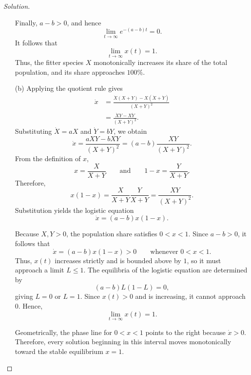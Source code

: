 \documentclass[10pt]{amsart}
\newenvironment{solution}
{\begin{proof}[Solution]}
{\end{proof}}
\begin{document}
\begin{onehalfspace}
\begin{solution}
\begin{itemize}
                Finally, \(a-b>0\), and hence
                \[
                    \lim_{t\to\infty}e^{-(a-b)t}=0.
                \]
                It follows that
                \[
                    \boxed{\lim_{t\to\infty}x(t)=1.}
                \]
                Thus, the fitter species \(X\) monotonically increases its share of
                the total population, and its share approaches \(100\%\).

                \item[(b)] Applying the quotient rule gives
                \begin{align*}
                    \dot{x}
                    &=\frac{\dot{X}(X+Y)-X(\dot{X}+\dot{Y})}
                    {(X+Y)^2}\\
                    &=\frac{\dot{X}Y-X\dot{Y}}{(X+Y)^2}.
                \end{align*}
                Substituting \(\dot{X}=aX\) and \(\dot{Y}=bY\), we obtain
                \[
                    \dot{x}
                    =\frac{aXY-bXY}{(X+Y)^2}
                    =(a-b)\frac{XY}{(X+Y)^2}.
                \]
                From the definition of \(x\),
                \[
                    x=\frac{X}{X+Y}
                    \qquad\text{and}\qquad
                    1-x=\frac{Y}{X+Y}.
                \]
                Therefore,
                \[
                    x(1-x)
                    =\frac{X}{X+Y}\frac{Y}{X+Y}
                    =\frac{XY}{(X+Y)^2}.
                \]
                Substitution yields the logistic equation
                \[
                    \boxed{\dot{x}=(a-b)x(1-x).}
                \]

                Because \(X,Y>0\), the population share satisfies \(0<x<1\).
                Since \(a-b>0\), it follows that
                \[
                    \dot{x}=(a-b)x(1-x)>0
                    \qquad\text{whenever }0<x<1.
                \]
                Thus, \(x(t)\) increases strictly and is bounded above by \(1\), so it
                must approach a limit \(L\leq 1\). The equilibria of the logistic
                equation are determined by
                \[
                    (a-b)L(1-L)=0,
                \]
                giving \(L=0\) or \(L=1\). Since \(x(t)>0\) and is increasing, it
                cannot approach \(0\). Hence,
                \[
                    \boxed{\lim_{t\to\infty}x(t)=1.}
                \]

                Geometrically, the phase line for \(0<x<1\) points to the right because
                \(\dot{x}>0\). Therefore, every solution beginning in this interval
                moves monotonically toward the stable equilibrium \(x=1\).
            \end{itemize}


\end{solution}
\end{onehalfspace}
\end{document}

